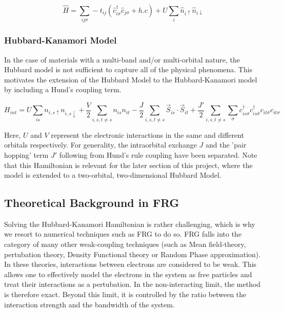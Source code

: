 \documentclass[12pt]{article}
\begin{document}
\begin{equation}\label{t Hubbard model}
    \hat{H} = \sum_{ij\sigma} -t_{ij}(\hat{c}_{i\sigma}^{\dagger}\hat{c}_{j \sigma} + h.c) 
    + U \sum_{i} \hat{n}_{i \uparrow} \hat{n}_{i \downarrow}
\end{equation}





\subsubsection{Hubbard-Kanamori Model}
\label{subsubsec: HKmodel}
In the case of materials with a multi-band and/or multi-orbital nature, the Hubbard model is not sufficient to capture all of the physical phenomena. This motivates the extension of the Hubbard Model to the Hubbard-Kanamori model\cite{sherman2020hubbard} by including a Hund's coupling term.

\begin{equation} \label{Hubbard-Kanamori Model}
    H_{int} = U \sum_{is}n_{i,s\uparrow}n_{i,s\downarrow} + \frac{V}{2} \sum_{i,s,t \neq s} n_{is}n_{it} -\frac{J}{2} \sum_{i,s,t \neq s} \vec{S}_{is} \cdot \vec{S}_{it} 
    + \frac{J'}{2} \sum_{i,s,t \neq s} \sum_{\sigma} c_{is\sigma}^{\dagger}c_{is\bar{\sigma}}^{\dagger}c_{it\bar{\sigma}}c_{it\sigma}
\end{equation}

\noindent Here, $U$ and $V$ represent the electronic interactions in the same and different orbitals respectively. For generality, the intraorbital exchange $J$ and the 'pair hopping' term $J'$ following from Hund's rule coupling have been separated.  
Note that this Hamiltonian is relevant for the later section of this project, where the model is extended to a two-orbital, two-dimensional Hubbard Model.

\subsection{Theoretical Background in FRG}

Solving the Hubbard-Kanamori Hamiltonian is rather challenging, which is why we resort to numerical techniques such as FRG to do so. FRG falls into the category of many other weak-coupling techniques (such as Mean field-theory\cite{kadanoff2009more}, pertubation theory\cite{nagaosa2013quantum}, Density Functional theory\cite{kohn1965self} or Random Phase approximation\cite{bohm1951collective}).
In these theories, interactions between electrons are considered to be weak. This allows one to effectively model the electrons in the system as free particles 
and treat their interactions as a pertubation. In the non-interacting limit, the method is therefore exact. Beyond this limit, it is controlled by the ratio between the interaction
strength and the bandwidth of the system. 
\end{document}
